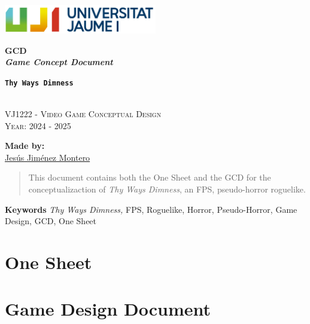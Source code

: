 \documentclass[12pt]{article}
\newcommand{\gameTitle}{\texttt{\textbf{Thy Ways Dimness}}}
\begin{document}
\begin{titlepage}
    \centering
    \vspace*{5cm}

    \includegraphics[width=0.5\textwidth]{Imagenes/marca-uji-color.jpg}\par\vspace{1cm}

    {\Huge \bfseries GCD \\ \textit{Game Concept Document} \par}
    {\large \bfseries \gameTitle \par}

    \textsc{\large }
    \vspace{0.5cm} \\
    \textsc{\Large VJ1222 - Video Game Conceptual Design}
    \vspace{0.5cm} \\
    \textsc{\large Year: 2024 - 2025}
    \vfill

    \textbf{Made by:}         \\
    \href{https://www.richardotomislav.com/}{Jesús Jiménez Montero }      \\

    \vspace{1cm}

    \vfill
\end{titlepage}

\begin{abstract}
    This document contains both the One Sheet and the GCD for the conceptualizaction of \textit{Thy Ways Dimness}, an FPS, pseudo-horror roguelike.
\end{abstract}
{\small \textbf{Keywords} \textit{Thy Ways Dimness,} FPS, Roguelike, Horror, Pseudo-Horror, Game Design, GCD, One Sheet}
\newpage

\renewcommand{\contentsname}{Table of Contents}
\tableofcontents
\newpage

\listoffigures
\newpage


\section*{One Sheet}

\newpage
\section*{Game Design Document}

\end{document}
